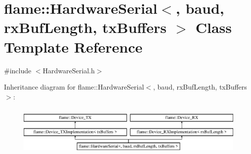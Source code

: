 \hypertarget{classflame_1_1_hardware_serial}{\section{flame\-:\-:Hardware\-Serial$<$, baud, rx\-Buf\-Length, tx\-Buffers $>$ Class Template Reference}
\label{classflame_1_1_hardware_serial}
}


{\ttfamily \#include $<$Hardware\-Serial.\-h$>$}

Inheritance diagram for flame\-:\-:Hardware\-Serial$<$, baud, rx\-Buf\-Length, tx\-Buffers $>$\-:\begin{figure}[H]
\begin{center}
\leavevmode
\includegraphics[height=2.492581cm]{classflame_1_1_hardware_serial}
\end{center}
\end{figure}
